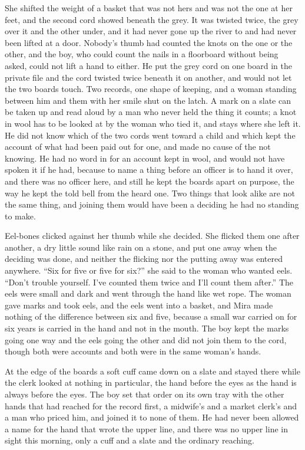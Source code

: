 She shifted the weight of a basket that was not hers and was not the one at her feet, and the second cord showed beneath the grey. It was twisted twice, the grey over it and the other under, and it had never gone up the river to  and had never been lifted at a door. Nobody's thumb had counted the knots on the one or the other, and the boy, who could count the nails in a floorboard without being asked, could not lift a hand to either. He put the grey cord on one board in the private file and the cord twisted twice beneath it on another, and would not let the two boards touch. Two records, one shape of keeping, and a woman standing between him and them with her smile shut on the latch. A mark on a slate can be taken up and read aloud by a man who never held the thing it counts; a knot in wool has to be looked at by the woman who tied it, and stays where she left it. He did not know which of the two cords went toward a child and which kept the account of what had been paid out for one, and made no cause of the not knowing. He had no word in  for an account kept in wool, and would not have spoken it if he had, because to name a thing before an officer is to hand it over, and there was no officer here, and still he kept the boards apart on purpose, the way he kept the told bell from the heard one. Two things that look alike are not the same thing, and joining them would have been a deciding he had no standing to make.

Eel-bones clicked against her thumb while she decided. She flicked them one after another, a dry little sound like rain on a stone, and put one away when the deciding was done, and neither the flicking nor the putting away was entered anywhere. “Six for five or five for six?” she said to the woman who wanted eels. “Don't trouble yourself. I've counted them twice and I'll count them after.” The eels were small and dark and went through the hand like wet rope. The woman gave marks and took eels, and the eels went into a basket, and Mira made nothing of the difference between six and five, because a small war carried on for six years is carried in the hand and not in the mouth. The boy kept the marks going one way and the eels going the other and did not join them to the cord, though both were accounts and both were in the same woman's hands.

At the edge of the boards a soft cuff came down on a slate and stayed there while the clerk looked at nothing in particular, the hand before the eyes as the hand is always before the eyes. The boy set that order on its own tray with the other hands that had reached for the record first, a midwife's and a market clerk's and a man who priced him, and joined it to none of them. He had never been allowed a name for the hand that wrote the upper line, and there was no upper line in sight this morning, only a cuff and a slate and the ordinary reaching.

